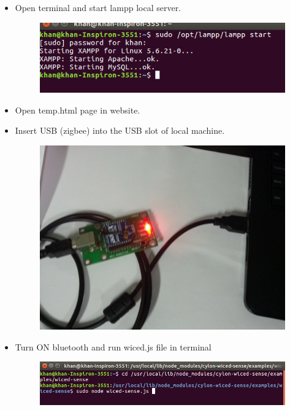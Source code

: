 \documentclass[11pt,a4paper]{article}
\begin{document}
	 \begin{itemize}
	 \item Open terminal and start lampp local server.
	 
	 	\begin{figure}[h]
    \centering
	\includegraphics[scale=0.5]{lampstart.png}
	\end{figure}
	 
	 \item Open temp.html page in website.
	 \item Insert USB (zigbee) into the USB slot of local machine.
	 
	 \begin{figure}[h]
        \centering
	    \includegraphics[scale=0.1]{20160722_194935.jpg}
	\end{figure}
	 
	 \item Turn ON bluetooth and run wiced.js file in terminal
	 
	 \begin{figure}[h]
    \centering
	\includegraphics[scale=0.5]{runwicedjs.png}
	\end{figure}
	 

\end{itemize}
\end{document}
